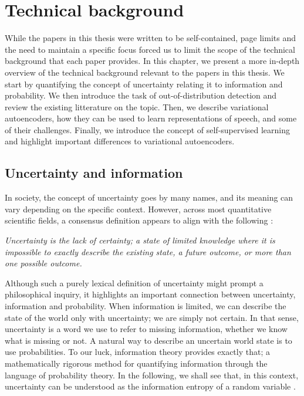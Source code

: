 

\chapter[technical background]{Technical background}\label{chp:technical-background}

While the papers in this thesis were written to be self-contained, page limits and the need to maintain a specific focus forced us to limit the scope of the technical background that each paper provides. In this chapter, we present a more in-depth overview of the technical background relevant to the papers in this thesis. 
We start by quantifying the concept of uncertainty relating it to information and probability. We then introduce the task of out-of-distribution detection and review the existing litterature on the topic. 
Then, we describe variational autoencoders, how they can be used to learn representations of speech, and some of their challenges. Finally, we introduce the concept of self-supervised learning and highlight important differences to variational autoencoders. 


\section{Uncertainty and information}

In society, the concept of uncertainty goes by many names, and its meaning can vary depending on the specific context. However, across most quantitative scientific fields, a consensus definition appears to align with the following \cite{hubbard_how_2014}:
%
\begin{center}
    \textit{Uncertainty is the lack of certainty; a state of limited knowledge where it is impossible to exactly describe the existing state, a future outcome, or more than one possible outcome.}
\end{center}
%
Although such a purely lexical definition of uncertainty might prompt a philosophical inquiry, it highlights an important connection between uncertainty, information and probability. When information is limited, we can describe the state of the world only with uncertainty; we are simply not certain. In that sense, uncertainty is a word we use to refer to missing information, whether we know what is missing or not. 
A natural way to describe an uncertain world state is to use probabilities. To our luck, information theory provides exactly that; a mathematically rigorous method for quantifying information through the language of probability theory. In the following, we shall see that, in this context, uncertainty can be understood as the information entropy of a random variable \cite{mackay_information_2003}. 


